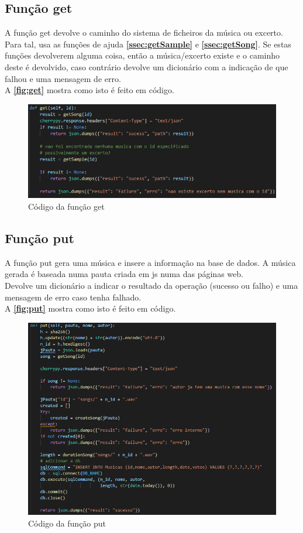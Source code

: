 \documentclass{report}
\begin{document}
\subsection{Função get}
\label{ssec:get}
A função get devolve o caminho do sistema de ficheiros da música ou excerto.
Para tal, usa as funções de ajuda \textbf{\autoref{ssec:getSample}} e \textbf{\autoref{ssec:getSong}}. Se estas funções devolverem alguma coisa, então a música/excerto existe e o caminho deste é devolvido, caso contrário devolve um dicionário com a indicação de que falhou e uma mensagem de erro.\\
A \textbf{\autoref{fig:get}} mostra como isto é feito em código.

\begin{figure}[!h]
\center 
\includegraphics[width=330pt]{img/get.png}
\caption{Código da função get}
\label{fig:get}
\end{figure}

\subsection{Função put}
\label{ssec:put}
A função put gera uma música e insere a informação na base de dados.
A música gerada é baseada numa pauta criada em js numa das páginas web.\\
Devolve um dicionário a indicar o resultado da operação (sucesso ou falho) e uma mensagem de erro caso tenha falhado.\\
A \textbf{\autoref{fig:put}} mostra como isto é feito em código.

\begin{figure}[!h]
\center 
\includegraphics[width=330pt]{img/put.png}
\caption{Código da função put}
\label{fig:put}
\end{figure}
\end{document}
